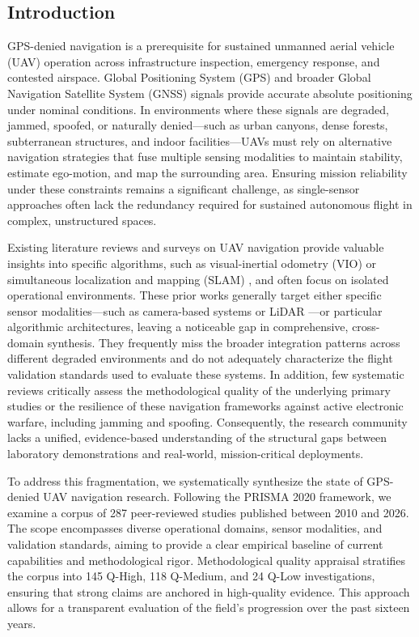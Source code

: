 \documentclass[conference]{IEEEtran}
\begin{document}
\subsection{Introduction}


GPS-denied navigation is a prerequisite for sustained unmanned aerial vehicle (UAV) operation across infrastructure inspection, emergency response, and contested airspace. Global Positioning System (GPS) and broader Global Navigation Satellite System (GNSS) signals provide accurate absolute positioning under nominal conditions. In environments where these signals are degraded, jammed, spoofed, or naturally denied—such as urban canyons, dense forests, subterranean structures, and indoor facilities—UAVs must rely on alternative navigation strategies that fuse multiple sensing modalities to maintain stability, estimate ego-motion, and map the surrounding area. Ensuring mission reliability under these constraints remains a significant challenge, as single-sensor approaches often lack the redundancy required for sustained autonomous flight in complex, unstructured spaces.


Existing literature reviews and surveys on UAV navigation provide valuable insights into specific algorithms, such as visual-inertial odometry (VIO) \cite{REC_0017,REC_0041,REC_0347} or simultaneous localization and mapping (SLAM) \cite{REC_0003,REC_0035,REC_0065}, and often focus on isolated operational environments. These prior works generally target either specific sensor modalities—such as camera-based systems or LiDAR \cite{REC_0008,REC_0013,REC_0043}—or particular algorithmic architectures, leaving a noticeable gap in comprehensive, cross-domain synthesis. They frequently miss the broader integration patterns across different degraded environments and do not adequately characterize the flight validation standards used to evaluate these systems. In addition, few systematic reviews critically assess the methodological quality of the underlying primary studies or the resilience of these navigation frameworks against active electronic warfare, including jamming and spoofing. Consequently, the research community lacks a unified, evidence-based understanding of the structural gaps between laboratory demonstrations and real-world, mission-critical deployments.


To address this fragmentation, we systematically synthesize the state of GPS-denied UAV navigation research. Following the PRISMA 2020 framework, we examine a corpus of 287 peer-reviewed studies published between 2010 and 2026. The scope encompasses diverse operational domains, sensor modalities, and validation standards, aiming to provide a clear empirical baseline of current capabilities and methodological rigor. Methodological quality appraisal stratifies the corpus into 145 Q-High, 118 Q-Medium, and 24 Q-Low investigations, ensuring that strong claims are anchored in high-quality evidence. This approach allows for a transparent evaluation of the field's progression over the past sixteen years.
\end{document}
